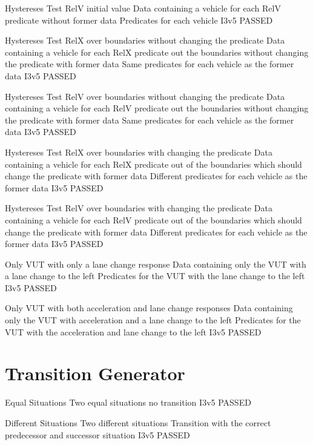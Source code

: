 \documentclass[a4paper, 11pt]{scrreprt}
\begin{document}
	{Hystereses Test RelV initial value}
	{Data containing a vehicle for each RelV predicate without former data}
	{Predicates for each vehicle}
	{I3v5}
	{PASSED}
	
	{Hystereses Test RelX over boundaries without changing the predicate}
	{Data containing a vehicle for each RelX predicate out the boundaries without changing the predicate with former data}
	{Same predicates for each vehicle as the former data}
	{I3v5}
	{PASSED}
	
	{Hystereses Test RelV over boundaries without changing the predicate}
	{Data containing a vehicle for each RelV predicate out the boundaries without changing the predicate with former data}
	{Same predicates for each vehicle as the former data}
	{I3v5}
	{PASSED}
	
	{Hystereses Test RelX over boundaries with changing the predicate}
	{Data containing a vehicle for each RelX predicate out of the boundaries which should change the predicate with former data}
	{Different predicates for each vehicle as the former data}
	{I3v5}
	{PASSED}
	
	{Hystereses Test RelV over boundaries with changing the predicate}
	{Data containing a vehicle for each RelV predicate out of the boundaries which should change the predicate with former data}
	{Different predicates for each vehicle as the former data}
	{I3v5}
	{PASSED}
	
	{Only VUT with only a lane change response}
	{Data containing only the VUT with a lane change to the left}
	{Predicates for the VUT with the lane change to the left}
	{I3v5}
	{PASSED}
	
	{Only VUT with both acceleration and lane change responses}
	{Data containing only the VUT with acceleration and a lane change to the left}
	{Predicates for the VUT with the acceleration and lane change to the left}
	{I3v5}
	{PASSED}

\section{Transition Generator}
	
	{Equal Situations}
	{Two equal situations}
	{no transition}
	{I3v5}
	{PASSED}
	
	{Different Situations}
	{Two different situations}
	{Transition with the correct predecessor and successor situation}
	{I3v5}
	{PASSED}
\end{document}
